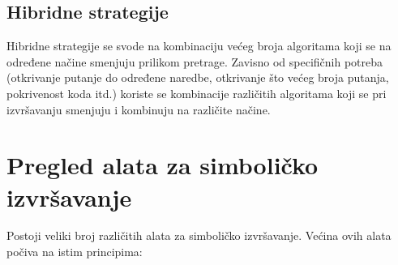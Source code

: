 \documentclass[12pt,oneside]{memoir}
\begin{document}
\subsection{Hibridne strategije} 
Hibridne strategije se svode na kombinaciju većeg broja algoritama koji se na određene načine smenjuju prilikom pretrage. Zavisno od specifičnih potreba (otkrivanje putanje do određene naredbe, otkrivanje što većeg broja putanja, pokrivenost koda itd.) koriste se kombinacije različitih algoritama koji se pri izvršavanju smenjuju i kombinuju na različite načine.

\section{Pregled alata za simboličko izvršavanje} \label{alati_za_simbolicko}

Postoji veliki broj različitih alata za simboličko izvršavanje. Većina ovih alata počiva na istim principima:
\end{document}
